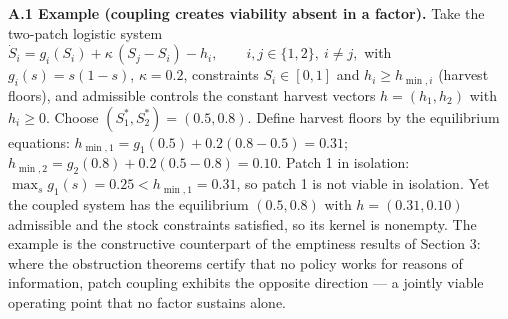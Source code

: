 \documentclass[11pt]{article}
\theoremstyle{definition}
\begin{document}
\textbf{A.1 Example (coupling creates viability absent in a factor).}
Take the two-patch logistic system
\(\dot S_i = g_i(S_i) + \kappa\,(S_j - S_i) - h_i, \qquad i, j \in \{1,2\},\ i \ne j,\)
with \(g_i(s) = s(1-s)\), \(\kappa = 0.2\), constraints \(S_i \in [0,1]\) and \(h_i \ge h_{\min,i}\) (harvest floors), and admissible controls the constant harvest vectors \(h = (h_1, h_2)\) with \(h_i \ge 0\). Choose
\((S_1^*, S_2^*) = (0.5, 0.8)\). Define harvest floors by the equilibrium equations: \(h_{\min,1} = g_1(0.5) + 0.2(0.8 - 0.5) = 0.31\); \(h_{\min,2} = g_2(0.8) + 0.2(0.5 - 0.8) = 0.10\). Patch 1 in isolation:
\(\max_s g_1(s) = 0.25 < h_{\min,1} = 0.31\), so patch 1 is not viable
in isolation. Yet the coupled system has the equilibrium \((0.5, 0.8)\)
with \(h = (0.31, 0.10)\) admissible and the stock constraints
satisfied, so its kernel is nonempty. The example is the constructive
counterpart of the emptiness results of Section 3: where the obstruction
theorems certify that no policy works for reasons of information, patch
coupling exhibits the opposite direction --- a jointly viable operating
point that no factor sustains alone.
\end{document}
